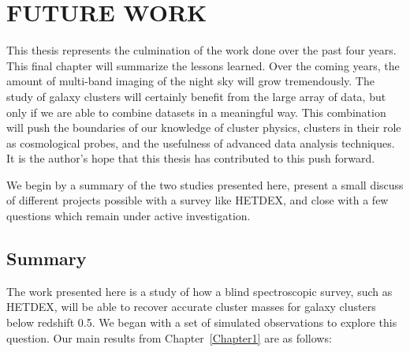 %
%
%



\chapter[\uppercase{Future Work}]{\uppercase{Future Work}}

This thesis represents the culmination of the work done over the past four years. This final chapter will summarize the lessons learned. Over the coming years, the amount of multi-band imaging of the night sky will grow tremendously. The study of galaxy clusters will certainly benefit from the large array of data, but only if we are able to combine datasets in a meaningful way. This combination will push the boundaries of our knowledge of cluster physics, clusters in their role as cosmological probes, and the usefulness of advanced data analysis techniques. It is the author's hope that this thesis has contributed to this push forward. 

We begin by a summary of the two studies presented here, present a small discuss of different projects possible with a survey like HETDEX, and close with a few questions which remain under active investigation.

\section{Summary} 
The work presented here is a study of how a blind spectroscopic survey, such as HETDEX, will be able to recover accurate cluster masses for galaxy clusters below redshift 0.5. We began with a set of simulated observations to explore this question. Our main results from Chapter~\ref{Chapter1} are as follows:

